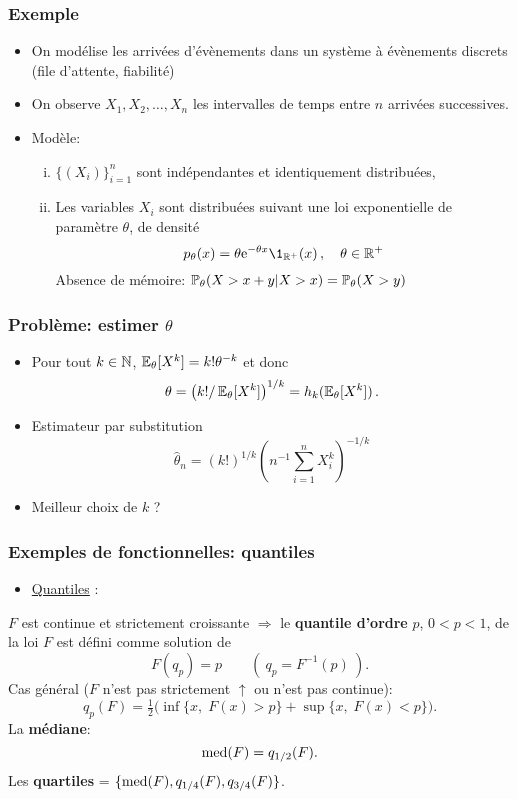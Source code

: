 \begin{frame}
\frametitle{Exemple}
\begin{itemize}
\item On modélise les arrivées d'évènements dans un système à évènements discrets (file d'attente, fiabilité)
\item On observe $X_1,X_2,\dots,X_n$ les intervalles de temps entre $n$ arrivées successives.
\item \alert{Modèle}: 
\begin{enumerate}[(i)]
\item $\{(X_i)\}_{i=1}^n$ sont indépendantes et identiquement distribuées,
\item Les variables $X_i$ sont distribuées suivant une loi exponentielle de paramètre $\theta$, de densité
    $$
    p_\theta(x) = \theta \rme^{-\theta x} \1_{\rset^+}(x) \eqsp, \quad \theta \in \rset^+
    $$
    \alert{Absence de mémoire:} $\operatorname{{\mathbb P}}_\theta(X > x + y | X > x)= \operatorname{{\mathbb P}}_\theta(X > y)$ 
\end{enumerate}
\end{itemize} 
\end{frame}

\begin{frame}
\frametitle{Problème: estimer $\theta$}
\begin{itemize}
\item Pour tout $k \in \mathbb{N}$, $\operatorname{{\mathbb E}}_\theta[X^k]= k ! \theta^{-k}$ et donc
$$
\theta = \left( k! /\operatorname{{\mathbb E}}_{\theta}[X^k] \right)^{1/k}  = h_k( \operatorname{{\mathbb E}}_\theta[X^k] ) \,.
$$
\item \alert{Estimateur par substitution}
$$
\hat{\theta}_n = (k! )^{1/k} \left(n^{-1} \sum_{i=1}^n X_i^k \right)^{-1/k}
$$
\item \alert{Meilleur choix de $k$ ?}
\end{itemize}
\end{frame}


\begin{frame}
\frametitle{Exemples de fonctionnelles: quantiles}
\begin{itemize}
\item \underline{Quantiles} :
\end{itemize}
$F$ est \alert{continue et strictement croissante}
$\Longrightarrow$ le {\bf quantile d'ordre} $p$, $0 < p < 1$, de la
loi $F$ est d\'efini comme solution de
$$
F(q_p) = p \quad \quad ( \ q_p=F^{-1}(p) \ ).
$$
\alert{Cas g\'en\'eral} ($F$ n'est pas strictement $\uparrow$
ou n'est pas continue):
$$
q_p(F) = \tfrac{1}{2}\big(\inf\{x,\;F(x)>p\}+\sup\{x,\;F(x) <
p\}\big).
$$
La {\bf médiane}:
$${\rm med}(F)=q_{1/2}(F).$$
Les {\bf quartiles} = $\{{\rm med}(F), q_{1/4}(F), q_{3/4}(F)\}$.
\end{frame}

